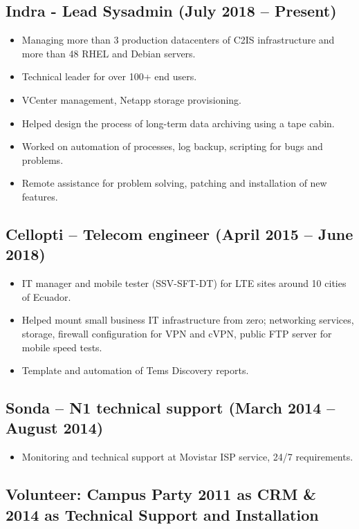 \documentclass{article}
\begin{document}
\subsection*{Indra - Lead Sysadmin (July 2018 – Present)}

\begin{itemize}
  \item Managing more than 3 production datacenters of C2IS infrastructure and more than 48 RHEL and Debian servers.
  \item Technical leader for over 100+ end users.
  \item VCenter management, Netapp storage provisioning.
  \item Helped design the process of long-term data archiving using a tape cabin.
  \item Worked on automation of processes, log backup, scripting for bugs and problems.
  \item Remote assistance for problem solving, patching and installation of new features.
\end{itemize}

\subsection*{Cellopti – Telecom engineer (April 2015 – June 2018)}

\begin{itemize}
  \item IT manager and mobile tester (SSV-SFT-DT) for LTE sites around 10 cities of Ecuador.
  \item Helped mount small business IT infrastructure from zero; networking services, storage, firewall configuration for VPN and cVPN, public FTP server for mobile speed tests.
  \item Template and automation of Tems Discovery reports.
\end{itemize}

\subsection*{Sonda – N1 technical support (March 2014 – August 2014)}

\begin{itemize}
  \item Monitoring and technical support at Movistar ISP service, 24/7 requirements.
\end{itemize}

\subsection*{Volunteer: Campus Party 2011 as CRM \& 2014 as Technical Support and Installation}
\end{document}
